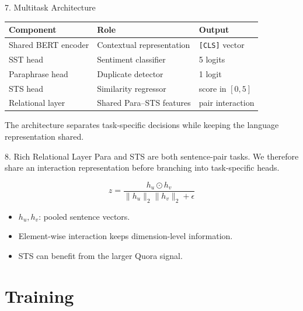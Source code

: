 \documentclass[t, aspectratio=169]{beamer}
\begin{document}
\begin{frame}{7. Multitask Architecture}
    \begin{center}
    \small
    \begin{tabular}{lll}
    \toprule
    Component & Role & Output \\
    \midrule
    Shared BERT encoder & Contextual representation & \texttt{[CLS]} vector \\
    SST head & Sentiment classifier & 5 logits \\
    Paraphrase head & Duplicate detector & 1 logit \\
    STS head & Similarity regressor & score in $[0,5]$ \\
    Relational layer & Shared Para--STS features & pair interaction \\
    \bottomrule
    \end{tabular}
    \end{center}

    \vspace{0.5em}
    The architecture separates task-specific decisions while keeping the language representation shared.
\end{frame}

\begin{frame}{8. Rich Relational Layer}
    Para and STS are both sentence-pair tasks. We therefore share an interaction representation before branching into task-specific heads.

    \[
        z = \frac{h_u \odot h_v}{\|h_u\|_2\|h_v\|_2+\epsilon}
    \]

    \begin{itemize}
        \item $h_u, h_v$: pooled sentence vectors.
        \item Element-wise interaction keeps dimension-level information.
        \item STS can benefit from the larger Quora signal.
    \end{itemize}
\end{frame}

\section{Training}
\end{document}
